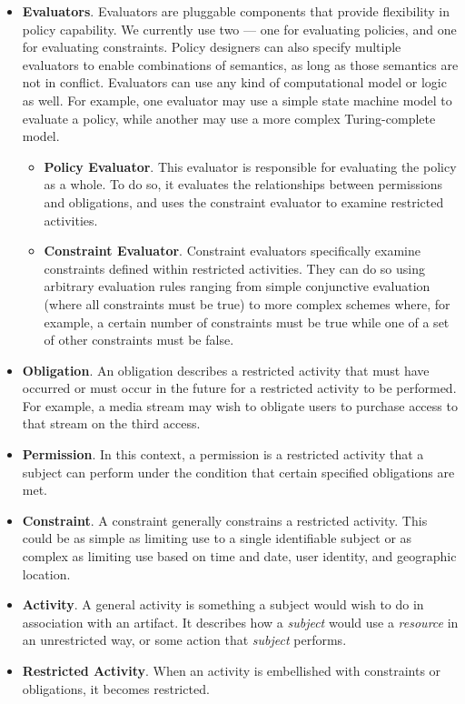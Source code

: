 \begin{itemize}
\item \textbf{Evaluators}.  Evaluators are pluggable components that provide flexibility in policy capability.  We currently use two --- one for evaluating policies, and one for evaluating constraints.  Policy designers can also specify multiple evaluators to enable combinations of semantics, as long as those semantics are not in conflict.  Evaluators can use any kind of computational model or logic as well.  For example, one evaluator may use a simple state machine model to evaluate a policy, while another may use a more complex Turing-complete model.
\begin{itemize}
\item \textbf{Policy Evaluator}.  This evaluator is responsible for evaluating the policy as a whole.  To do so, it evaluates the relationships between permissions and obligations, and uses the constraint evaluator to examine restricted activities.
\item \textbf{Constraint Evaluator}.  Constraint evaluators specifically examine constraints defined within restricted activities.  They can do so using arbitrary evaluation rules ranging from simple conjunctive evaluation (where all constraints must be true) to more complex schemes where, for example, a certain number of constraints must be true while one of a set of other constraints must be false.
\end{itemize}
\item \textbf{Obligation}.  An obligation describes a restricted activity that must have occurred or must occur in the future for a restricted activity to be performed.  For example, a media stream may wish to obligate users to purchase access to that stream on the third access.
\item \textbf{Permission}.  In this context, a permission is a restricted activity that a subject can perform under the condition that certain specified obligations are met.
\item \textbf{Constraint}.  A constraint generally constrains a restricted activity.  This could be as simple as limiting use to a single identifiable subject or as complex as limiting use based on time and date, user identity, and geographic location.
\item \textbf{Activity}.  A general activity is something a subject would wish to do in association with an artifact.  It describes how a \emph{subject} would use a \emph{resource} in an unrestricted way, or some action that \emph{subject} performs.
\item \textbf{Restricted Activity}.  When an activity is embellished with constraints or obligations, it becomes restricted.
\end{itemize}


